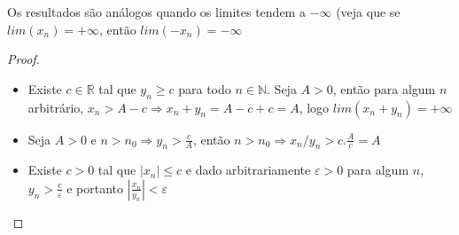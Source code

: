 Os resultados são análogos quando os limites tendem a $-\infty$ (veja que se $lim(x_{n})=+\infty$, então $lim(-x_{n})=-\infty$

\begin{proof}
\begin{itemize}
    \item Existe $c \in \mathbb{R}$ tal que $y_{n}\geq c$ para todo $n\in\mathbb{N}$. Seja $A>0$, então para algum $n$ arbitrário, $x_{n}>A-c\Rightarrow x_{n}+y_{n}=A-c+c=A$, logo $lim(x_{n}+y_{n})=+\infty$
    \item Seja $A>0$ e $n>n_{0}\Rightarrow y_{n}>\frac{c}{A}$, então $n>n_{0}\Rightarrow x_{n}/y_{n}>c.\frac{A}{c}=A$
    \item  Existe $c>0$ tal que $|x_{n}|\leq c$ e dado arbitrariamente $\varepsilon>0$ para algum $n$, $y_{n}>\frac{c}{\varepsilon}$ e portanto $|\frac{x_{n}}{y_{n}}|<\varepsilon$
\end{itemize}
\end{proof}
\newpage
